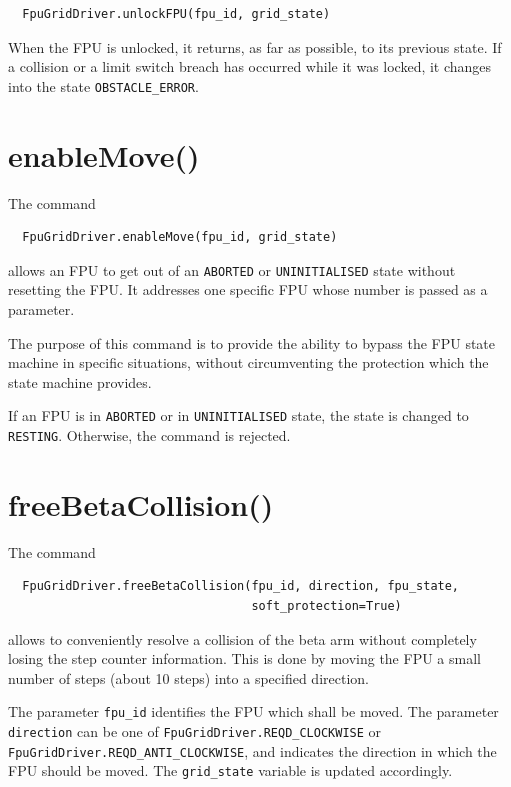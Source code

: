 \documentclass[fontsize=12,a4paper]{scrreprt}
\begin{document}
\begin{verbatim}
  FpuGridDriver.unlockFPU(fpu_id, grid_state)
\end{verbatim}


When the FPU is unlocked, it returns, as far as possible, to its
previous state. If a collision or a limit switch breach has occurred
while it was locked, it changes into the state
\texttt{OBSTACLE\_ERROR}.



\section{enableMove()}

The command
\begin{verbatim}
  FpuGridDriver.enableMove(fpu_id, grid_state)
\end{verbatim}
allows an FPU to get out of an \texttt{ABORTED} or
\texttt{UNINITIALISED} state without resetting the FPU. It addresses
one specific FPU whose number is passed as a parameter.

The purpose of this command is to provide the ability to bypass the
FPU state machine in specific situations, without circumventing the
protection which the state machine provides.

If an FPU is in \texttt{ABORTED} or in \texttt{UNINITIALISED} state,
the state is changed to \texttt{RESTING}. Otherwise, the command is
rejected.


\section{freeBetaCollision()}

The command
\begin{verbatim}
  FpuGridDriver.freeBetaCollision(fpu_id, direction, fpu_state,
                                  soft_protection=True)
\end{verbatim}
allows to conveniently resolve a collision
of the beta arm without completely losing the step counter
information. This is done by moving the FPU a small number of steps
(about 10 steps) into a specified direction.

\begin{sloppypar}
The parameter \texttt{fpu\_id} identifies the FPU which shall be
moved. The parameter \texttt{direction} can be one of
\texttt{FpuGridDriver.REQD\_CLOCKWISE} or
\texttt{FpuGridDriver.REQD\_ANTI\_CLOCKWISE}, and indicates the
direction in which the FPU should be moved. The \texttt{grid\_state}
variable is updated accordingly.
\end{sloppypar}
\end{document}
